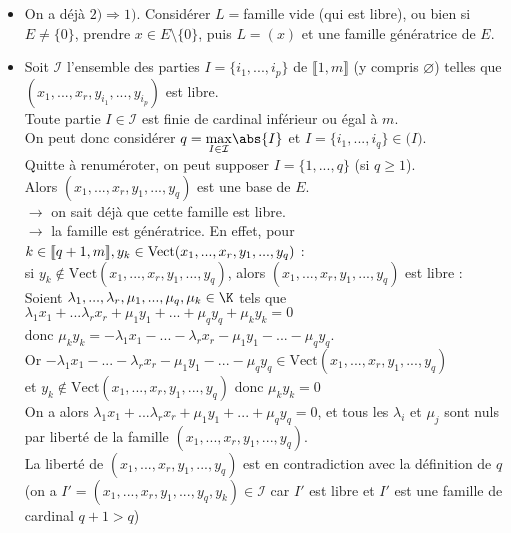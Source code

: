\documentclass[12pt, a4paper]{report}
\begin{document}
\begin{demo}{}
\begin{itemize}
	\item On a déjà $2) \Longrightarrow 1)$. Considérer $L = $famille vide (qui est libre), ou bien si $E \ne \{0\}$, prendre $x \in E \setminus \{0\}$, puis $L = (x)$ et une famille génératrice de $E$. \\
	\item Soit $\mathcal{I}$ l'ensemble des parties $I = \{i_1,...,i_p \}$ de $\llbracket 1,m \rrbracket$ (y compris $\varnothing$) telles que $(x_1,...,x_r,y_{i_1},...,y_{i_p})$ est libre. \\
	
	Toute partie $I \in \mathcal{I}$ est finie de cardinal inférieur ou égal à $m$. \\
	On peut donc considérer $q = \underset{I \in \mathcal{I}}{\max} \abs{I}$ et $I = \{i_1,...,i_q\} \in \mathcal(I)$. \\
	Quitte à renuméroter, on peut supposer $I = \{1,...,q\}$ (si $q \ge 1$). \\
	
	Alors $(x_1,...,x_r,y_1,...,y_q)$ est une base de $E$. \\
	$\longrightarrow$ on sait déjà que cette famille est libre. \\
	$\longrightarrow$ la famille est génératrice. En effet, pour $k \in \llbracket q+1,m \rrbracket, \\
	y_k \in \text{Vect}(x_1,...,x_r,y_1,...,y_q)$ : \\
	si $y_k \not \in \text{Vect}(x_1,...,x_r,y_1,...,y_q)$, alors $(x_1,...,x_r,y_1,...,y_q)$ est libre : \\
	Soient $\lambda_1,...,\lambda_r,\mu_1,...,\mu_q,\mu_k \in \K$ tels que \\
	 $\lambda_1x_1+...\lambda_rx_r+\mu_1y_1+...+\mu_qy_q+\mu_ky_k = 0$ \\
	 donc $\mu_ky_k = -\lambda_1x_1-...-\lambda_rx_r-\mu_1y_1-...-\mu_qy_q$. \\
	 Or $-\lambda_1x_1-...-\lambda_rx_r-\mu_1y_1-...-\mu_qy_q \in \text{Vect}(x_1,...,x_r,y_1,...,y_q)$ \\
	 et $y_k \not \in \text{Vect}(x_1,...,x_r,y_1,...,y_q)$ donc $\mu_ky_k = 0$ \\
	 On a alors $\lambda_1x_1+...\lambda_rx_r+\mu_1y_1+...+\mu_qy_q= 0$, et tous les $\lambda_i$ et $\mu_j$ sont nuls par liberté de la famille $(x_1,...,x_r,y_1,...,y_q)$. \\
	 
	La liberté de $(x_1,...,x_r,y_1,...,y_q)$ est en contradiction avec la définition de $q$ \\
	(on a $I' = (x_1,...,x_r,y_1,...,y_q,y_k) \in \mathcal{I}$ car $I'$ est libre et $I'$ est une famille de cardinal $q+1 > q$) \\
	

\end{itemize}
\end{demo}
\end{document}
